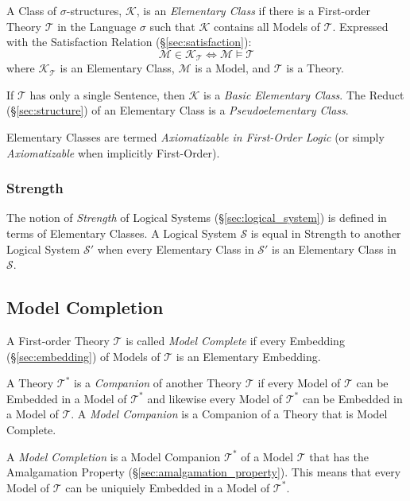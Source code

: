 A Class of $\sigma$-structures, $\mathcal{K}$, is an \emph{Elementary
  Class} if there is a First-order Theory $\mathcal{T}$ in the
Language $\sigma$ such that $\mathcal{K}$ contains all Models of
$\mathcal{T}$. Expressed with the Satisfaction Relation
(\S\ref{sec:satisfaction}):
\[
  \mathcal{M} \in \mathcal{K}_\mathcal{T}
  \Leftrightarrow \mathcal{M} \models \mathcal{T}
\]
where $\mathcal{K}_\mathcal{T}$ is an Elementary Class, $\mathcal{M}$
is a Model, and $\mathcal{T}$ is a Theory.

If $\mathcal{T}$ has only a single Sentence, then $\mathcal{K}$ is a
\emph{Basic Elementary Class}. The Reduct (\S\ref{sec:structure}) of
an Elementary Class is a \emph{Pseudoelementary Class}.

Elementary Classes are termed \emph{Axiomatizable in First-Order
  Logic} (or simply \emph{Axiomatizable} when implicitly First-Order).



\subsubsection{Strength}\label{sec:strength}

The notion of \emph{Strength} of Logical Systems
(\S\ref{sec:logical_system}) is defined in terms of Elementary
Classes. A Logical System $\mathcal{S}$ is equal in Strength to
another Logical System $\mathcal{S}'$ when every Elementary Class in
$\mathcal{S}'$ is an Elementary Class in $\mathcal{S}$.



\subsection{Model Completion}\label{sec:model_completion}

A First-order Theory $\mathcal{T}$ is called \emph{Model Complete} if
every Embedding (\S\ref{sec:embedding}) of Models of $\mathcal{T}$ is
an Elementary Embedding.

A Theory $\mathcal{T}^*$ is a \emph{Companion} of another Theory
$\mathcal{T}$ if every Model of $\mathcal{T}$ can be Embedded in a
Model of $\mathcal{T}^*$ and likewise every Model of $\mathcal{T}^*$
can be Embedded in a Model of $\mathcal{T}$. A \emph{Model Companion}
is a Companion of a Theory that is Model Complete.

A \emph{Model Completion} is a Model Companion $\mathcal{T}^*$ of a
Model $\mathcal{T}$ that has the Amalgamation Property
(\S\ref{sec:amalgamation_property}). This means that every Model of
$\mathcal{T}$ can be uniquiely Embedded in a Model of $\mathcal{T}^*$.



